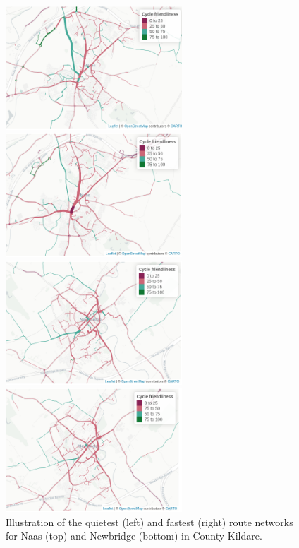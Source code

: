 \documentclass[
  super,
  preprint,
  3p]{elsarticle}
\begin{document}
\begin{figure}

\begin{minipage}{0.50\linewidth}
\includegraphics[width=2.60417in,height=\textheight]{naas_quietest_godutch.png}\end{minipage}%
%
\begin{minipage}{0.50\linewidth}
\includegraphics[width=2.60417in,height=\textheight]{naas_fastest_godutch.png}\end{minipage}%
\newline
\begin{minipage}{0.50\linewidth}
\includegraphics[width=2.60417in,height=\textheight]{newbridge_quietest_godutch.png}\end{minipage}%
%
\begin{minipage}{0.50\linewidth}
\includegraphics[width=2.60417in,height=\textheight]{newbridge_fastest_godutch.png}\end{minipage}%

\caption{\label{fig-route-types}Illustration of the quietest (left) and
fastest (right) route networks for Naas (top) and Newbridge (bottom) in
County Kildare.}

\end{figure}%
\end{document}
